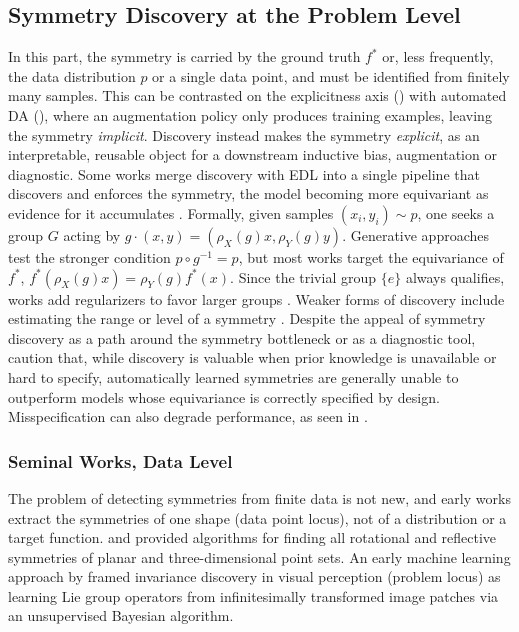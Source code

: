 \documentclass[mathematics,review,submit,moreauthors]{Definitions/mdpi}
\begin{document}
\subsection{Symmetry Discovery at the Problem Level}\label{sec:sym-disc-from-data}
In this part, the symmetry is carried by the ground truth $f^*$ or, less frequently, the data distribution $p$ or a single data point, and must be identified from finitely many samples.
This can be contrasted on the explicitness axis () with automated DA (), where an augmentation policy only produces training examples, leaving the symmetry \emph{implicit}.
Discovery instead makes the symmetry \emph{explicit}, as an interpretable, reusable object for a downstream inductive bias, augmentation or diagnostic.
Some works merge discovery with EDL into a single pipeline that discovers and enforces the symmetry, the model becoming more equivariant as evidence for it accumulates \citep{benton2020anips,otto2025,escriche2025}.
Formally, given samples $(x_i,y_i)\sim p$, one seeks a group $G$ acting by $g\cdot(x,y)=(\rho_X(g)x,\rho_Y(g)y)$.
Generative approaches test the stronger condition $p\circ g^{-1}=p$, but most works target the equivariance of $f^*$, $f^*(\rho_X(g)x)=\rho_Y(g)f^*(x)$.
Since the trivial group $\{e\}$ always qualifies, works add regularizers to favor larger groups \citep{benton2020anips,yang2023p4icml,escriche2025}.
Weaker forms of discovery include estimating the range or level of a symmetry \citep{benton2020anips,ouderaa2022}.
Despite the appeal of symmetry discovery as a path around the symmetry bottleneck or as a diagnostic tool, \citet{rath2024air} caution that, while discovery is valuable when prior knowledge is unavailable or hard to specify, automatically learned symmetries are generally unable to outperform models whose equivariance is correctly specified by design.
Misspecification can also degrade performance, as seen in .


\subsubsection{Seminal Works, Data Level}
The problem of detecting symmetries from finite data is not new, and early works extract the symmetries of one shape (data point locus), not of a distribution or a target function.
\citet{highnam1985} and \citet{wolter1985tvc} provided algorithms for finding all rotational and reflective symmetries of planar and three-dimensional point sets.
An early machine learning approach by \citet{rao1998anips} framed invariance discovery in visual perception (problem locus) as learning Lie group operators from infinitesimally transformed image patches via an unsupervised Bayesian algorithm.
\end{document}
